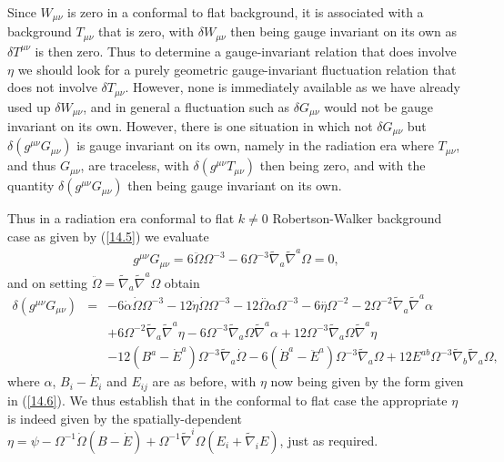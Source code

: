 Since $W_{\mu\nu}$ is zero in a conformal to flat background, it is associated with a background $T_{\mu\nu}$ that is zero, with $\delta W_{\mu\nu}$ then being gauge invariant on its own as $\delta T^{\mu\nu}$ is then zero. Thus to determine a gauge-invariant relation that does involve $\eta$ we should look for a purely geometric gauge-invariant fluctuation relation that does not involve $\delta T_{\mu\nu}$. However, none is immediately available as we have already used up $\delta W_{\mu\nu}$, and in general a fluctuation such as $\delta G_{\mu\nu}$ would not be gauge invariant on its own. However, there is one situation in which not $\delta G_{\mu\nu}$ but  $\delta(g^{\mu\nu}G_{\mu\nu})$ is gauge invariant on its own, namely in the radiation era where $T_{\mu\nu}$, and thus $G_{\mu\nu}$, are traceless, with $\delta (g^{\mu\nu}T_{\mu\nu})$ then being zero, and with the quantity $\delta(g^{\mu\nu}G_{\mu\nu})$ then being gauge invariant on its own.

Thus in a radiation era conformal to flat $k\neq 0$ Robertson-Walker background case as given by (\ref{14.5}) we evaluate 
%
\begin{eqnarray}
g^{\mu\nu}G_{\mu\nu}=6\ddot{\Omega}\Omega^{-3}-6\Omega^{-3}\tilde{\nabla}_a\tilde{\nabla}^a\Omega=0,
\label{14.10}
\end{eqnarray}
%
and on setting $\ddot{\Omega}=\tilde{\nabla}_a\tilde{\nabla}^a\Omega$ obtain 
%
\begin{eqnarray}
\delta(g^{\mu\nu} G_{\mu\nu})&=& -6 \dot{\alpha} \dot{\Omega} \Omega^{-3} - 12 \dot{\eta} \dot{\Omega} \Omega^{-3} - 12 \overset{..}{\Omega} \alpha \Omega^{-3} - 6 \overset{..}{\eta} \Omega^{-2} - 2 \Omega^{-2} \tilde{\nabla}_{a}\tilde{\nabla}^{a}\alpha 
\nonumber\\
&&+ 6 \Omega^{-2} \tilde{\nabla}_{a}\tilde{\nabla}^{a}\eta  - 6 \Omega^{-3} \tilde{\nabla}_{a}\Omega \tilde{\nabla}^{a}\alpha
+ 12 \Omega^{-3} \tilde{\nabla}_{a}\Omega \tilde{\nabla}^{a}\eta
\\
&& -12 (B^{a}-\dot{E}^a) \Omega^{-3} \tilde{\nabla}_{a}\dot{\Omega} - 6 (\dot{B}^{a}-\ddot{E}^a) \Omega^{-3} \tilde{\nabla}_{a}\Omega +12 E^{ab} \Omega^{-3} \tilde{\nabla}_{b}\tilde{\nabla}_{a}\Omega,
\nonumber
\label{14.11}
\end{eqnarray}
%
where $\alpha$, $B_i-\dot{E}_i$ and $E_{ij}$ are as before, with $\eta$ now being given by the form given in (\ref{14.6}). We thus establish that in the conformal to flat case the appropriate $\eta$ is indeed given by the spatially-dependent $\eta=\psi -\Omega^{-1}\dot{\Omega}(B-\dot E)+\Omega^{-1}\tilde\nabla^i\Omega(E_i+\tilde\nabla_i E)$, just as required.

